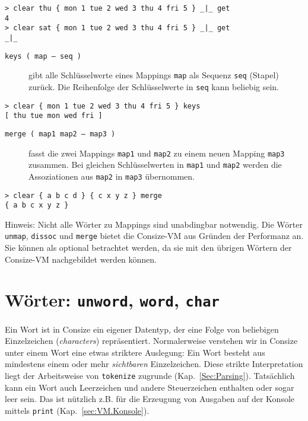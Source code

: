 \begin{verbatim}
> clear thu { mon 1 tue 2 wed 3 thu 4 fri 5 } _|_ get
4
> clear sat { mon 1 tue 2 wed 3 thu 4 fri 5 } _|_ get
_|_
\end{verbatim}

\begin{description}
\item[\texttt{keys ( map -- seq )}] gibt alle Schlüsselwerte eines Mappings \verb|map| als Sequenz \verb|seq| (Stapel) zurück. Die Reihenfolge der Schlüsselwerte in \verb|seq| kann beliebig sein.
\end{description}

\begin{verbatim}
> clear { mon 1 tue 2 wed 3 thu 4 fri 5 } keys
[ thu tue mon wed fri ]
\end{verbatim}

\begin{description}
\item[\texttt{merge ( map1 map2 -- map3 )}] fasst die zwei Mappings \verb|map1| und \verb|map2| zu einem neuen Mapping \verb|map3| zusammen. Bei gleichen Schlüsselwerten in \verb|map1| und \verb|map2| werden die Assoziationen aus \verb|map2| in \verb|map3| übernommen.
\end{description}

\begin{verbatim}
> clear { a b c d } { c x y z } merge
{ a b c x y z }
\end{verbatim}

Hinweis: Nicht alle Wörter zu Mappings sind unabdingbar notwendig. Die Wörter \verb|unmap|, \verb|dissoc| und \verb|merge| bietet die Consize-VM aus Gründen der Performanz an. Sie können als optional betrachtet werden, da sie mit den übrigen Wörtern der Consize-VM nachgebildet werden können.

\section{Wörter: \texttt{unword}, \texttt{word}, \texttt{char}}

Ein Wort ist in Consize ein eigener Datentyp, der eine Folge von beliebigen Einzelzeichen (\emph{characters}) repräsentiert. Normalerweise verstehen wir in Consize unter einem Wort eine etwas striktere Auslegung: Ein Wort besteht aus mindestens einem oder mehr \emph{sichtbaren} Einzelzeichen. Diese strikte Interpretation liegt der Arbeitsweise von \verb|tokenize| zugrunde (Kap.~\ref{Sec:Parsing}). Tatsächlich kann ein Wort auch Leerzeichen und andere Steuerzeichen enthalten oder sogar leer sein. Das ist nützlich z.B. für die Erzeugung von Ausgaben auf der Konsole mittels \verb|print| (Kap.~\ref{sec:VM.Konsole}).

